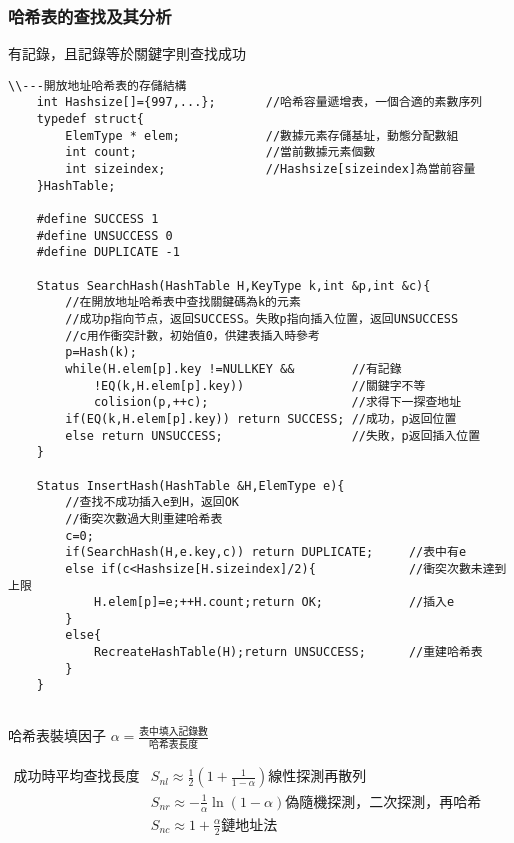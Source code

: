 \documentclass[UTF8]{ctexart}
\newcommand{\mt}[1]{\text{#1}}
\newcommand{\mf}[1]{\left( #1\right)}
\newcommand{\ma}[1]{\begin{array}{llll} #1 \end{array}}
\begin{document}
\newpage
\subsubsection{哈希表的查找及其分析}

有記錄，且記錄等於關鍵字則查找成功

\begin{lstlisting}[style=v1]
    \\---開放地址哈希表的存儲結構
    int Hashsize[]={997,...};       //哈希容量遞增表，一個合適的素數序列
    typedef struct{
        ElemType * elem;            //數據元素存儲基址，動態分配數組
        int count;                  //當前數據元素個數    
        int sizeindex;              //Hashsize[sizeindex]為當前容量
    }HashTable;

    #define SUCCESS 1
    #define UNSUCCESS 0
    #define DUPLICATE -1

    Status SearchHash(HashTable H,KeyType k,int &p,int &c){
        //在開放地址哈希表中查找關鍵碼為k的元素
        //成功p指向节点，返回SUCCESS。失敗p指向插入位置，返回UNSUCCESS
        //c用作衝突計數，初始值0，供建表插入時參考
        p=Hash(k);
        while(H.elem[p].key !=NULLKEY &&        //有記錄
            !EQ(k,H.elem[p].key))               //關鍵字不等
            colision(p,++c);                    //求得下一探查地址
        if(EQ(k,H.elem[p].key)) return SUCCESS; //成功，p返回位置
        else return UNSUCCESS;                  //失敗，p返回插入位置
    }
 
    Status InsertHash(HashTable &H,ElemType e){
        //查找不成功插入e到H，返回OK
        //衝突次數過大則重建哈希表
        c=0;
        if(SearchHash(H,e.key,c)) return DUPLICATE;     //表中有e
        else if(c<Hashsize[H.sizeindex]/2){             //衝突次數未達到上限   
            H.elem[p]=e;++H.count;return OK;            //插入e
        }
        else{
            RecreateHashTable(H);return UNSUCCESS;      //重建哈希表
        }
    }
 
\end{lstlisting}


哈希表裝填因子  $\alpha=\frac{\mt{表中填入記錄數}}{\mt{哈希表長度}}$


$\ma{
    \mt{成功時平均查找長度}
    &S_{nl} \approx \frac{1}{2}\mf{1+\frac{1}{1-\alpha}} \mt{線性探測再散列}\\
    &S_{nr} \approx -\frac{1}{\alpha} \ln \mf{1 -\alpha} \mt{偽隨機探測，二次探測，再哈希}\\
    &S_{nc} \approx 1+\frac{\alpha}{2} \mt{鏈地址法}
}$
\end{document}
